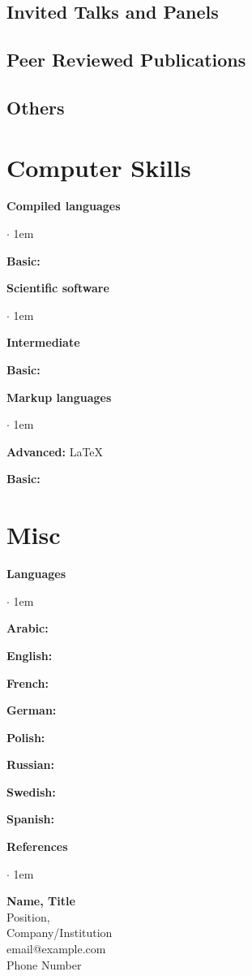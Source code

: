 \documentclass[a4paper]{article}
\newenvironment{achievements}%
	{%
		\begin{list}{$\cdot$}{\topsep 0pt \itemsep 2pt \parsep 0pt \leftmargin 1em}%
		\linespread{1.05} \selectfont %
	}%
{\end{list}\vspace*{4pt}}
\newcommand{\simpleunit}[2]{%
	\textbf{#1}\begin{achievements}#2\end{achievements}%
}
\begin{document}
\subsection*{Invited Talks and Panels}

\subsection*{Peer Reviewed Publications}

\subsection*{Others}

\section{Computer Skills}
	\simpleunit{Compiled languages}{
		\item{\textbf{Basic:} }
	}
	\simpleunit{Scientific software}{
		\item{\textbf{Intermediate} }
		\item{\textbf{Basic:} }
	}
	\simpleunit{Markup languages}{
		\item{\textbf{Advanced:} \LaTeX}
		\item{\textbf{Basic:} }
	}

\section{Misc}
	\simpleunit{Languages}{
		\item{\textbf{Arabic:} }
		\item{\textbf{English:} }
		\item{\textbf{French:} }
		\item{\textbf{German:} }
		\item{\textbf{Polish:} }
		\item{\textbf{Russian:} }
		\item{\textbf{Swedish:} }
		\item{\textbf{Spanish:} }
	}

	\simpleunit{References \vspace{10pt}}{
		\item{
			\textbf{Name, Title}\\
			Position, \\
			Company/Institution\\
			\Letter \; email@example.com\\
			\Telefon \; Phone Number
		}\vspace{10pt}
	}
\end{document}

